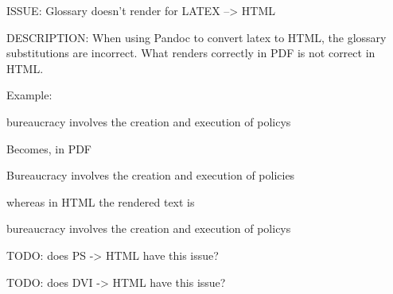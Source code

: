 ISSUE: Glossary doesn't render for LATEX --> HTML

DESCRIPTION: When using Pandoc to convert latex to HTML, the glossary substitutions are incorrect. 
What renders correctly in PDF is not correct in HTML. 

Example:

\Gls{bureaucracy} involves the creation and execution of \glspl{policy}

Becomes, in PDF

Bureaucracy involves the creation and execution of policies

whereas in HTML the rendered text is

bureaucracy involves the creation and execution of policys


TODO: does PS -> HTML have this issue?

TODO: does DVI -> HTML have this issue?

